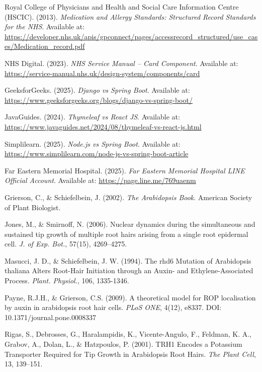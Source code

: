 \begin{thebibliography}{99}
    Royal College of Physicians and Health and Social Care Information Centre (HSCIC). (2013). \emph{Medication and Allergy Standards: Structured Record Standards for the NHS}.
    Available at: \url{https://developer.nhs.uk/apis/gpconnect/pages/accessrecord_structured/use_cases/Medication_record.pdf}

    NHS Digital. (2023). \emph{NHS Service Manual – Card Component}.
    Available at: \url{https://service-manual.nhs.uk/design-system/components/card}

    GeeksforGeeks. (2025). \emph{Django vs Spring Boot}.
    Available at: \url{https://www.geeksforgeeks.org/blogs/django-vs-spring-boot/}

    JavaGuides. (2024). \emph{Thymeleaf vs React JS}.
    Available at: \url{https://www.javaguides.net/2024/08/thymeleaf-vs-react-js.html}

    Simplilearn. (2025). \emph{Node.js vs Spring Boot}.
    Available at: \url{https://www.simplilearn.com/node-js-vs-spring-boot-article}

    Far Eastern Memorial Hospital. (2025). \emph{Far Eastern Memorial Hospital LINE Official Account}.
    Available at: \url{https://page.line.me/769uaenm}

    Grierson, C., \& Schiefelbein, J. (2002). \emph{The Arabidopsis Book}. American Society of Plant Biologist.

    Jones, M., \& Smirnoff, N. (2006). Nuclear dynamics during the simultaneous and sustained tip growth of multiple root hairs arising from a single root epidermal cell. \emph{J. of Exp. Bot.}, 57(15), 4269--4275.

    Masucci, J. D., \& Schiefelbein, J. W. (1994). The rhd6 Mutation of Arabidopsis thaliana Alters Root-Hair Initiation through an Auxin- and Ethylene-Associated Process. \emph{Plant. Physiol.}, 106, 1335-1346.

    Payne, R.J.H., \& Grierson, C.S. (2009). A theoretical model for ROP localisation by auxin in arabidopsis root hair cells. \emph{PLoS ONE}, 4(12), e8337.
    DOI: 10.1371/journal.pone.0008337

    Rigas, S., Debrosses, G., Haralampidis, K., Vicente-Angulo, F., Feldman, K. A., Grabov, A., Dolan, L., \& Hatzpoulos, P. (2001). TRH1 Encodes a Potassium Transporter Required for Tip Growth in Arabidopsis Root Hairs. \emph{The Plant Cell}, 13, 139--151.


\end{thebibliography}
